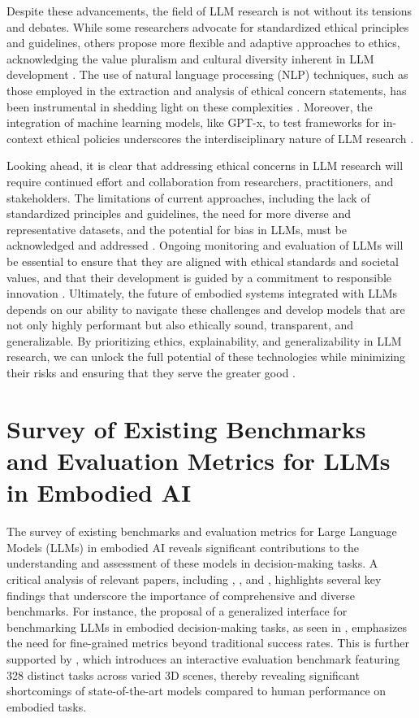 \documentclass[conference]{IEEEtran}
\begin{document}
Despite these advancements, the field of LLM research is not without its tensions and debates. While some researchers advocate for standardized ethical principles and guidelines, others propose more flexible and adaptive approaches to ethics, acknowledging the value pluralism and cultural diversity inherent in LLM development \cite{b8}. The use of natural language processing (NLP) techniques, such as those employed in the extraction and analysis of ethical concern statements, has been instrumental in shedding light on these complexities \cite{b9}. Moreover, the integration of machine learning models, like GPT-x, to test frameworks for in-context ethical policies underscores the interdisciplinary nature of LLM research \cite{b10}.

Looking ahead, it is clear that addressing ethical concerns in LLM research will require continued effort and collaboration from researchers, practitioners, and stakeholders. The limitations of current approaches, including the lack of standardized principles and guidelines, the need for more diverse and representative datasets, and the potential for bias in LLMs, must be acknowledged and addressed \cite{b11}. Ongoing monitoring and evaluation of LLMs will be essential to ensure that they are aligned with ethical standards and societal values, and that their development is guided by a commitment to responsible innovation \cite{b12}. Ultimately, the future of embodied systems integrated with LLMs depends on our ability to navigate these challenges and develop models that are not only highly performant but also ethically sound, transparent, and generalizable. By prioritizing ethics, explainability, and generalizability in LLM research, we can unlock the full potential of these technologies while minimizing their risks and ensuring that they serve the greater good \cite{b13}.

\section{Survey of Existing Benchmarks and Evaluation Metrics for LLMs in Embodied AI}
The survey of existing benchmarks and evaluation metrics for Large Language Models (LLMs) in embodied AI reveals significant contributions to the understanding and assessment of these models in decision-making tasks. A critical analysis of relevant papers, including \cite{b1}, \cite{b2}, and \cite{b3}, highlights several key findings that underscore the importance of comprehensive and diverse benchmarks. For instance, the proposal of a generalized interface for benchmarking LLMs in embodied decision-making tasks, as seen in \cite{b1}, emphasizes the need for fine-grained metrics beyond traditional success rates. This is further supported by \cite{b2}, which introduces an interactive evaluation benchmark featuring 328 distinct tasks across varied 3D scenes, thereby revealing significant shortcomings of state-of-the-art models compared to human performance on embodied tasks.
\end{document}
